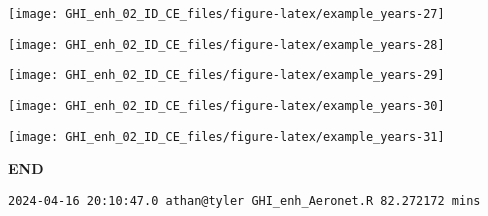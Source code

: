 \documentclass[
  10pt,
  a4paper,oneside]{article}
\begin{document}
\begin{center}\texttt{[image: GHI\_enh\_02\_ID\_CE\_files/figure-latex/example\_years-27]} \end{center}

\begin{center}\texttt{[image: GHI\_enh\_02\_ID\_CE\_files/figure-latex/example\_years-28]} \end{center}

\begin{center}\texttt{[image: GHI\_enh\_02\_ID\_CE\_files/figure-latex/example\_years-29]} \end{center}

\begin{center}\texttt{[image: GHI\_enh\_02\_ID\_CE\_files/figure-latex/example\_years-30]} \end{center}

\begin{center}\texttt{[image: GHI\_enh\_02\_ID\_CE\_files/figure-latex/example\_years-31]} \end{center}

\textbf{END}

\begin{verbatim}
2024-04-16 20:10:47.0 athan@tyler GHI_enh_Aeronet.R 82.272172 mins
\end{verbatim}
\end{document}
